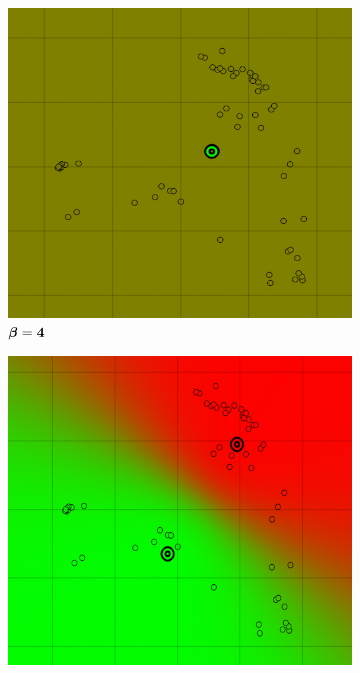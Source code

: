 \begin{figure}[!h]
\centering
	\begin{subfigure}[h]{0.30\textwidth}
    \centering
	\includegraphics[height=0.08\textheight]{./clustering/soft_k_mean_beta_4.png}
	\caption{$\boldsymbol \beta \bf = 4$}
	\end{subfigure}
    \begin{subfigure}[h]{0.30\textwidth}
    \centering
    \includegraphics[height=0.08\textheight]{./clustering/soft_k_mean_beta_10.png}

\end{subfigure}
\end{figure}
